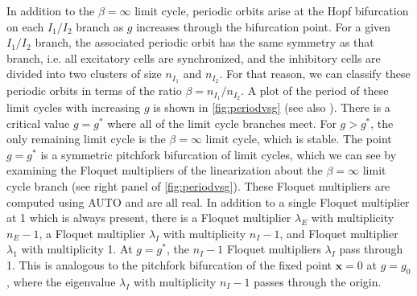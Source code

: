 \documentclass[reqno]{siamonline190516}
\newcommand{\xvec}{\mathbf{x}}
\begin{document}
In addition to the $\beta = \infty$ limit cycle, periodic orbits arise at the Hopf bifurcation on each $I_1/I_2$ branch as $g$ increases through the bifurcation point. For a given $I_1/I_2$ branch, the associated periodic orbit has the same symmetry as that branch, i.e. all excitatory cells are synchronized, and the inhibitory cells are divided into two clusters of size $n_{I_1}$ and $n_{I_2}$. For that reason, we can classify these periodic orbits in terms of the ratio $\beta = n_{I_1}/n_{I_2}$. A plot of the period of these limit cycles with increasing $g$ is shown in \cref{fig:periodvsg} (see also \cite[Fig. 2]{Barreiro2017}). There is a critical value $g = g^*$ where all of the limit cycle branches meet. For $g > g^*$, the only remaining limit cycle is the $\beta = \infty$ limit cycle, which is stable. The point $g = g^*$ is a symmetric pitchfork bifurcation of limit cycles, which we can see by examining the Floquet multipliers of the linearization about the $\beta = \infty$ limit cycle branch (see right panel of \cref{fig:periodvsg}). These Floquet multipliers are computed using AUTO and are all real. In addition to a single Floquet multiplier at 1 which is always present, there is a Floquet multiplier $\lambda_E$ with multiplicity $n_E - 1$, a Floquet multiplier $\lambda_I$ with multiplicity $n_I - 1$, and Floquet multiplier $\lambda_1$ with multiplicity 1. At $g = g^*$, the $n_I - 1$ Floquet multipliers $\lambda_I$ pass through 1. This is analogous to the pitchfork bifurcation of the fixed point $\xvec = 0$ at $g = g_0$, where the eigenvalue $\lambda_I$ with multiplicity $n_I - 1$ passes through the origin.
\end{document}
